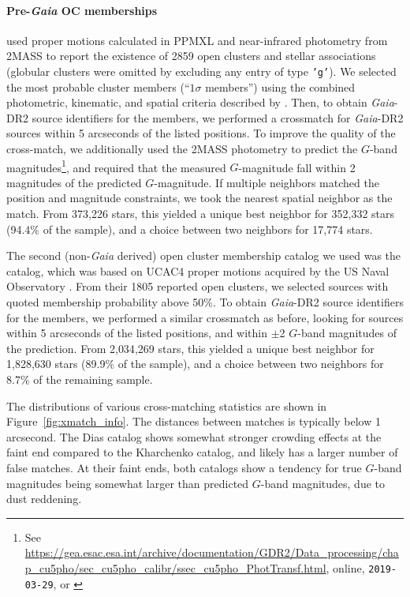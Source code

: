 \documentclass[12pt,twocolumn,tighten]{aastex62}
\begin{document}
\paragraph{Pre-{\it Gaia} OC memberships}
\citet{Kharchenko_et_al_2013} used proper motions calculated in PPMXL
\citep[][a combination of USNO-B1{.}0 and 2MASS
astrometry]{roeser_ppmxl_2010} and near-infrared photometry from 2MASS
\citep{skrutskie_tmass_2006} to report the existence of 2859 open
clusters and stellar associations (globular clusters were omitted by
excluding any entry of type \texttt{'g'}).  We selected the most
probable cluster members (``$1\sigma$ members'') using the combined
photometric, kinematic, and spatial criteria described by
\citet[][Section~3.3]{kharchenko_global_2012}.  Then, to obtain {\it
Gaia}-DR2 source identifiers for the members, we performed a
crossmatch for {\it Gaia}-DR2 sources within 5 arcseconds of the
listed positions.  To improve the quality of the cross-match, we
additionally used the 2MASS photometry to predict the $G$-band
magnitudes\footnote{See
\url{https://gea.esac.esa.int/archive/documentation/GDR2/Data_processing/chap_cu5pho/sec_cu5pho_calibr/ssec_cu5pho_PhotTransf.html},
online, \texttt{2019-03-29}, or \citet{carrasco_gaia_2016}}, and
required that the measured $G$-magnitude fall within 2 magnitudes of
the predicted $G$-magnitude.  If multiple neighbors matched the
position and magnitude constraints, we took the nearest spatial
neighbor as the match.  From 373{,}226 stars, this yielded a unique
best neighbor for 352{,}332 stars (94.4\% of the sample), and a choice
between two neighbors for 17{,}774 stars. 

The second (non-{\it Gaia} derived) open cluster membership catalog we
used was the \citet{dias_proper_2014} catalog, which was based on
UCAC4 proper motions acquired by the US Naval Observatory
\citep{zacharias_fourth_2013}.
From their 1805 reported open clusters, we selected sources with
quoted membership probability above 50\%.
To obtain {\it Gaia}-DR2 source identifiers for the members, we
performed a similar crossmatch as before, looking for sources within 5
arcseconds of the listed positions, and within $\pm$2 $G$-band
magnitudes of the prediction.
From 2{,}034{,}269 stars, this yielded a unique
best neighbor for 1{,}828{,}630 stars (89.9\% of the sample), and a choice
between two neighbors for 8.7\% of the remaining sample. 

The distributions of various cross-matching statistics are shown in
Figure~\ref{fig:xmatch_info}.  The distances between matches is
typically below 1 arcsecond.  The Dias catalog shows somewhat stronger
crowding effects at the faint end compared to the Kharchenko catalog,
and likely has a larger number of false matches.
At their faint ends, both catalogs show a tendency for true $G$-band
magnitudes being somewhat larger than predicted $G$-band magnitudes,
due to dust reddening.
\end{document}
